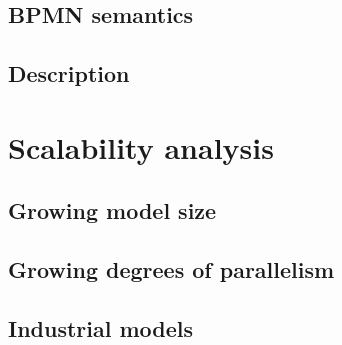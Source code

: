\documentclass[runningheads]{llncs}
\begin{document}


\subsection{BPMN semantics}

\subsection{Description}
\cite{camundaservicesgmbhBpmnjs2024}


\section{Scalability analysis}

\subsection{Growing model size}

\subsection{Growing degrees of parallelism}

\subsection{Industrial models}
\end{document}
